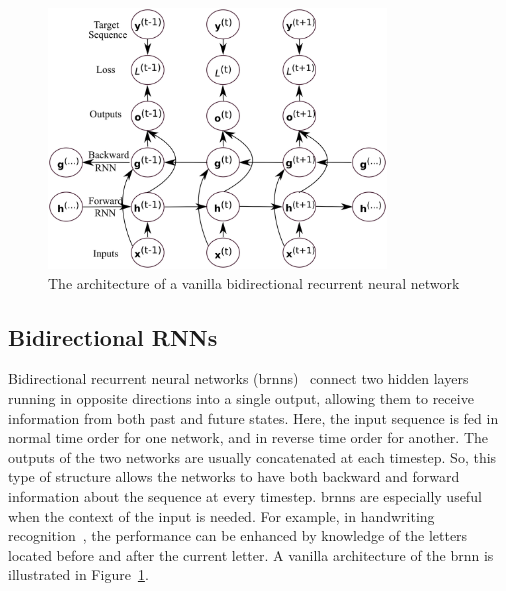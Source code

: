 \begin{figure}[t]
	\centering
	\includegraphics[width=0.8\textwidth]{figures/brnn.eps}
	\caption{The architecture of a vanilla bidirectional recurrent neural network \label{fig:bidirectional_rnn}}
\end{figure}



\subsection{Bidirectional RNNs}
Bidirectional recurrent neural networks (\gls{brnn}s)~\cite{Schuster_97} connect two hidden layers running in opposite directions into a single output, allowing them to receive information from both past and future states. Here, the input sequence is fed in normal time order for one network, and in reverse time order for another. The outputs of the two networks are usually concatenated at each timestep. So, this type of structure allows the networks to have both backward and forward information about the sequence at every timestep. \gls{brnn}s are especially useful when the context of the input is needed. For example, in handwriting recognition~\cite{Graves_08}, the performance can be enhanced by knowledge of the letters located before and after the current letter.  A vanilla architecture of the \gls{brnn} is illustrated in Figure~\ref{fig:bidirectional_rnn}. 


